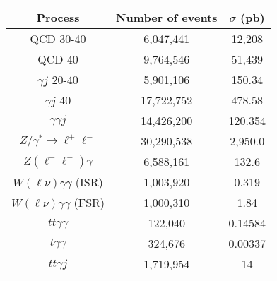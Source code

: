 \begin{tabular}{|c|c|c|}
\hline
Process & Number of events & $\sigma$ (pb) \\
\hline
QCD 30-40 & 6,047,441 & 12,208 \\   
QCD 40    & 9,764,546 & 51,439 \\      
$\gamma j$ 20-40& 5,901,106 & 150.34 \\   
$\gamma j$ 40   & 17,722,752 & 478.58 \\     
$\gamma\gamma j$& 14,426,200 & 120.354 \\ 
\hline
$Z/\gamma^*\rightarrow\ell^+\ell^-$ & 30,290,538 & 2,950.0 \\       
$Z(\ell^+\ell^-)\gamma$& 6,588,161 & 132.6 \\           
$W(\ell\nu)\gamma\gamma$ (ISR) & 1,003,920 & 0.319\\        
$W(\ell\nu)\gamma\gamma$ (FSR) & 1,000,310 & 1.84\\         
\hline
$t\bar{t}\gamma\gamma$ & 122,040 & 0.14584 \\              
$t\gamma\gamma$ & 324,676 & 0.00337 \\               
$t\bar{t}\gamma j$ & 1,719,954 & 14 \\             
\hline
\end{tabular}


